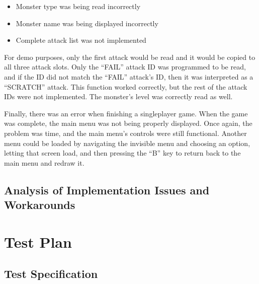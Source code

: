 \documentclass[12pt]{article} %
\begin{document}
\begin{itemize}
\begin{itemize}
\begin{itemize}
\begin{itemize}
\begin{itemize}
\begin{itemize}
	\item Monster type was being read incorrectly
	\item Monster name was being displayed incorrectly
	\item Complete attack list was not implemented
\end{itemize}

For demo purposes, only the first attack would be read and it would be copied
to all three attack slots.  Only the ``FAIL'' attack ID was programmed to be
read, and if the ID did not match the ``FAIL'' attack's ID, then it was
interpreted as a ``SCRATCH'' attack.  This function worked correctly, but the
rest of the attack IDs were not implemented.  The monster's level was correctly
read as well.

Finally, there was an error when finishing a singleplayer game.  When the game
was complete, the main menu was not being properly displayed.  Once again, the
problem was time, and the main menu's controls were still functional.  Another
menu could be loaded by navigating the invisible menu and choosing an option,
letting that screen load, and then pressing the ``B'' key to return back to the
main menu and redraw it.

\subsection{Analysis of Implementation Issues and Workarounds} %
%
%

\section{Test Plan } %
%

\subsection{Test Specification} %
%
%


\end{itemize}
\end{itemize}
\end{itemize}
\end{itemize}
\end{itemize}
\end{document}
